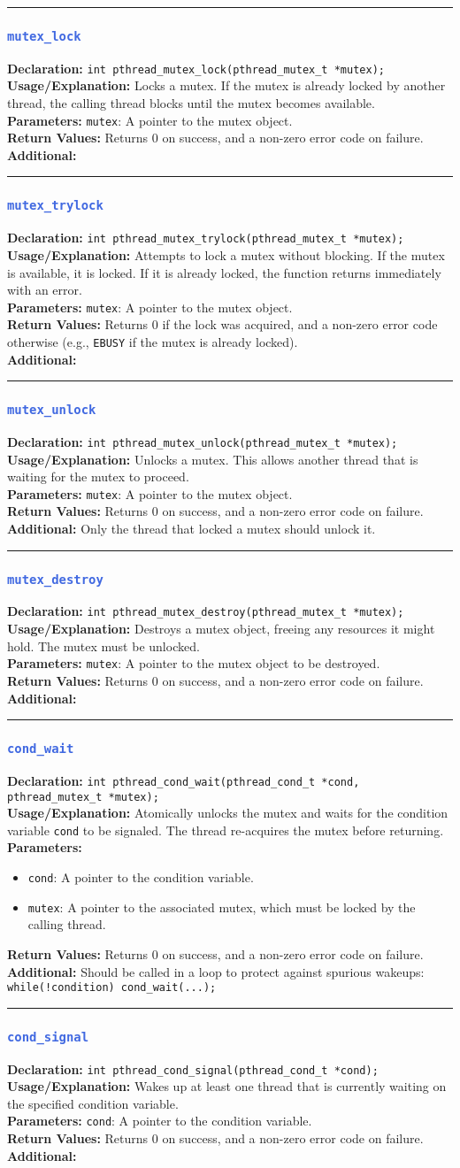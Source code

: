 \documentclass[openany,12pt]{book}
\newcommand{\code}[1]{\texttt{#1}}
\newcommand{\blue}[1]{\textcolor{RoyalBlue}{#1}}
\newcommand{\functionEntry}[6]{%
  \noindent\rule{\linewidth}{0.5pt}
  \subsubsection*{\blue{\large{\texttt{#1}}}}
  \textbf{Declaration:} \texttt{#2} \\
  \textbf{Usage/Explanation:} #3 \\
  \textbf{Parameters:} #4 \\
  \textbf{Return Values:} #5 \\
  \textbf{Additional:} #6
  \vspace{1em}
}
\newcommand{\functionEntryPar}[6]{%
  \noindent\rule{\linewidth}{0.5pt}
  \subsubsection*{\blue{\large{\texttt{#1}}}}
  \textbf{Declaration:} \texttt{#2} \\
  \textbf{Usage/Explanation:} #3 \\
  \textbf{Parameters:}
  \begin{itemize}[leftmargin=*]
    #4
  \end{itemize}
  \textbf{Return Values:} #5 \\
  \textbf{Additional:} #6
  \vspace{1em}
}
\begin{document}
\functionEntry{mutex\_lock}
{int pthread\_mutex\_lock(pthread\_mutex\_t *mutex);}
{Locks a mutex. If the mutex is already locked by another thread, the calling thread blocks until the mutex becomes available.}
{\code{mutex}: A pointer to the mutex object.}
{Returns 0 on success, and a non-zero error code on failure.}
{\label{func:mutex_lock}}

\functionEntry{mutex\_trylock}
{int pthread\_mutex\_trylock(pthread\_mutex\_t *mutex);}
{Attempts to lock a mutex without blocking. If the mutex is available, it is locked. If it is already locked, the function returns immediately with an error.}
{\code{mutex}: A pointer to the mutex object.}
{Returns 0 if the lock was acquired, and a non-zero error code otherwise (e.g., \code{EBUSY} if the mutex is already locked).}
{\label{func:mutex_trylock}}

\functionEntry{mutex\_unlock}
{int pthread\_mutex\_unlock(pthread\_mutex\_t *mutex);}
{Unlocks a mutex. This allows another thread that is waiting for the mutex to proceed.}
{\code{mutex}: A pointer to the mutex object.}
{Returns 0 on success, and a non-zero error code on failure.}
{Only the thread that locked a mutex should unlock it.\label{func:mutex_unlock}}

\functionEntry{mutex\_destroy}
{int pthread\_mutex\_destroy(pthread\_mutex\_t *mutex);}
{Destroys a mutex object, freeing any resources it might hold. The mutex must be unlocked.}
{\code{mutex}: A pointer to the mutex object to be destroyed.}
{Returns 0 on success, and a non-zero error code on failure.}
{\label{func:mutex_destroy}}

\functionEntryPar{cond\_wait}
{int pthread\_cond\_wait(pthread\_cond\_t *cond, pthread\_mutex\_t *mutex);}
{Atomically unlocks the mutex and waits for the condition variable \code{cond} to be signaled. The thread re-acquires the mutex before returning.}
{\item \code{cond}: A pointer to the condition variable.
 \item \code{mutex}: A pointer to the associated mutex, which must be locked by the calling thread.}
{Returns 0 on success, and a non-zero error code on failure.}
{Should be called in a loop to protect against spurious wakeups: \code{while(!condition) cond\_wait(...);}\label{func:cond_wait}}

\functionEntry{cond\_signal}
{int pthread\_cond\_signal(pthread\_cond\_t *cond);}
{Wakes up at least one thread that is currently waiting on the specified condition variable.}
{\code{cond}: A pointer to the condition variable.}
{Returns 0 on success, and a non-zero error code on failure.}
{\label{func:cond_signal}}
\end{document}
